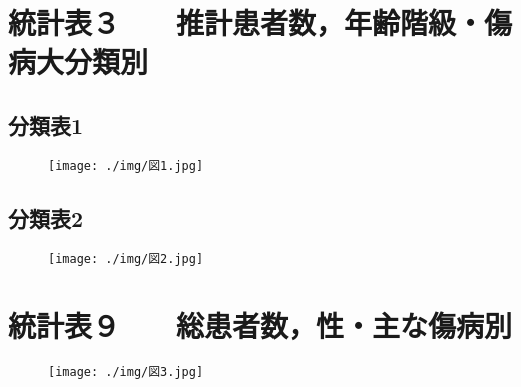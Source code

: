 %
\appendix
\renewcommand{\thesection}{付録.\ \arabic{section}}
\renewcommand{\thesubsection}{\ \arabic{section}-\arabic{subsection}}
%
\section{統計表３　　推計患者数，年齢階級・傷病大分類別}
\subsection{分類表1}
%
\begin{figure}[h]
  \begin{center}
    \texttt{[image: ./img/図1.jpg]}
  \end{center}
\end{figure}
%
\newpage
\subsection{分類表2}
%
\begin{figure}[h]
  \begin{center}
    \texttt{[image: ./img/図2.jpg]}
  \end{center}
\end{figure}
%
\newpage
\section{統計表９　　総患者数，性・主な傷病別 }
%
\begin{figure}[h]
  \begin{center}
    \texttt{[image: ./img/図3.jpg]}
  \end{center}
\end{figure}


%
